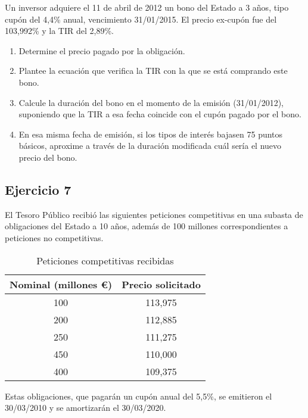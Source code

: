 Un inversor adquiere el 11 de abril de 2012 un bono del Estado a 3 años, tipo cupón del 4,4\% anual, vencimiento 31/01/2015. El precio ex-cupón fue del 103,992\% y la TIR del 2,89\%.

\begin{enumerate}[label=\textbf{\alph*)}]
    \item Determine el precio pagado por la obligación.
    \item Plantee la ecuación que verifica la TIR con la que se está comprando este bono.
    \item Calcule la duración del bono en el momento de la emisión (31/01/2012), suponiendo que la TIR a esa fecha coincide con el cupón pagado por el bono.
    \item En esa misma fecha de emisión, si los tipos de interés bajasen 75 puntos básicos, aproxime a través de la duración modificada cuál sería el nuevo precio del bono.
\end{enumerate}



\subsection*{Ejercicio 7 }

El Tesoro Público recibió las siguientes peticiones competitivas en una subasta de obligaciones del Estado a 10 años, además de 100 millones correspondientes a peticiones no competitivas.

\begin{table}[H]
\centering
\begin{tabular}{|c|c|}
\hline
Nominal (millones €) & Precio solicitado \\ \hline
100                  & 113,975           \\ \hline
200                  & 112,885           \\ \hline
250                  & 111,275           \\ \hline
450                  & 110,000           \\ \hline
400                  & 109,375           \\ \hline
\end{tabular}
\caption{Peticiones competitivas recibidas}
\end{table}

Estas obligaciones, que pagarán un cupón anual del 5,5\%, se emitieron el 30/03/2010 y se amortizarán el 30/03/2020.

